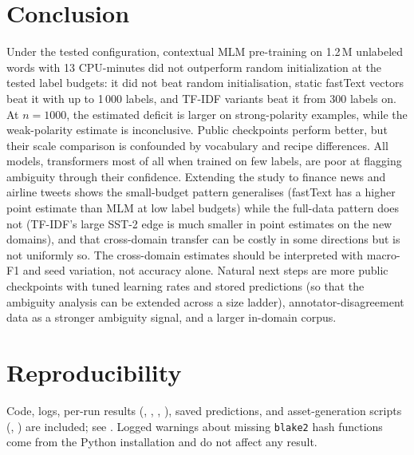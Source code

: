 \documentclass[11pt,a4paper]{article}
\begin{document}
\section{Conclusion}
Under the tested configuration, contextual MLM pre-training on 1.2\,M unlabeled words with 13 CPU-minutes did not outperform random initialization at the tested label budgets: it did not beat random initialisation, static fastText vectors beat it with up to 1\,000 labels, and TF-IDF variants beat it from 300 labels on.
At $n=1000$, the estimated deficit is larger on strong-polarity examples, while the weak-polarity estimate is inconclusive. Public checkpoints perform better, but their scale comparison is confounded by vocabulary and recipe differences.
All models, transformers most of all when trained on few labels, are poor at flagging ambiguity through their confidence. Extending the study to finance news and airline tweets shows the small-budget pattern generalises (fastText has a higher point estimate than MLM at low label budgets) while the full-data pattern does not (TF-IDF's large SST-2 edge is much smaller in point estimates on the new domains), and that cross-domain transfer can be costly in some directions but is not uniformly so. The cross-domain estimates should be interpreted with macro-F1 and seed variation, not accuracy alone. Natural next steps are more public checkpoints with tuned learning rates and stored predictions (so that the ambiguity analysis can be extended across a size ladder), annotator-disagreement data as a stronger ambiguity signal, and a larger in-domain corpus.

\section*{Reproducibility}
Code, logs, per-run results (, , , ), saved predictions, and asset-generation scripts (, ) are included; see .
Logged warnings about missing \texttt{blake2} hash functions come from the Python installation and do not affect any result.



\end{document}
